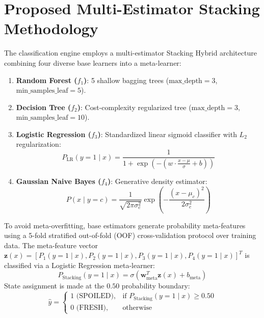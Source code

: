 \documentclass[conference]{IEEEtran}
\begin{document}
\section{Proposed Multi-Estimator Stacking Methodology}
The classification engine employs a multi-estimator Stacking Hybrid architecture combining four diverse base learners into a meta-learner:
\begin{enumerate}
    \item \textbf{Random Forest ($f_1$)}: 5 shallow bagging trees ($\text{max\_depth} = 3$, $\text{min\_samples\_leaf} = 5$).
    \item \textbf{Decision Tree ($f_2$)}: Cost-complexity regularized tree ($\text{max\_depth} = 3$, $\text{min\_samples\_leaf} = 10$).
    \item \textbf{Logistic Regression ($f_3$)}: Standardized linear sigmoid classifier with $L_2$ regularization:
    \begin{equation}
    P_{\text{LR}}(y=1 \mid x) = \frac{1}{1 + \exp\left(-\left(w \cdot \frac{x - \mu}{\sigma} + b\right)\right)}
    \end{equation}
    \item \textbf{Gaussian Naive Bayes ($f_4$)}: Generative density estimator:
    \begin{equation}
    P(x \mid y=c) = \frac{1}{\sqrt{2\pi\sigma_c^2}} \exp\left(-\frac{(x - \mu_c)^2}{2\sigma_c^2}\right)
    \end{equation}
\end{enumerate}

To avoid meta-overfitting, base estimators generate probability meta-features using a 5-fold stratified out-of-fold (OOF) cross-validation protocol over training data. The meta-feature vector $\mathbf{z}(x) = [P_1(y=1 \mid x), P_2(y=1 \mid x), P_3(y=1 \mid x), P_4(y=1 \mid x)]^T$ is classified via a Logistic Regression meta-learner:
\begin{equation}
P_{\text{Stacking}}(y=1 \mid x) = \sigma\left(\mathbf{w}_{\text{meta}}^T \mathbf{z}(x) + b_{\text{meta}}\right)
\end{equation}
State assignment is made at the $0.50$ probability boundary:
\begin{equation}
\hat{y} = \begin{cases} 1 \text{ (SPOILED)}, & \text{if } P_{\text{Stacking}}(y=1 \mid x) \ge 0.50 \\ 0 \text{ (FRESH)}, & \text{otherwise} \end{cases}
\end{equation}
\end{document}
